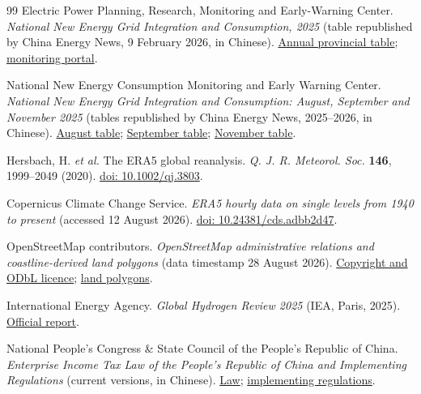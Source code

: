 \documentclass[lineno,pdflatex,sn-nature]{sn-jnl}
\begin{document}
\begin{thebibliography}{99}
Electric Power Planning, Research, Monitoring and Early-Warning Center. \emph{National New Energy Grid Integration and Consumption, 2025} (table republished by China Energy News, 9 February 2026, in Chinese). \href{https://epaper.ceic.com/pad/content/202602/09/content_20205.html}{Annual provincial table}; \href{https://www.xnyxnyj.cn/}{monitoring portal}.

National New Energy Consumption Monitoring and Early Warning Center. \emph{National New Energy Grid Integration and Consumption: August, September and November 2025} (tables republished by China Energy News, 2025--2026, in Chinese). \href{https://epaper.ceic.com/pc/attachment/202510/13/26e6af76-e1b7-40fb-b126-bc59f391e51c.pdf}{August table}; \href{https://epaper.ceic.com/pc/attachment/202511/07/6063762d-43ea-41fc-a37d-5f5549f62a5d.pdf}{September table}; \href{https://epaper.ceic.com/pc/attachment/202601/12/bf2a9f58-b724-435d-8c46-447e3ebbdc3d.pdf}{November table}.

Hersbach, H. \emph{et al.} The ERA5 global reanalysis. \emph{Q. J. R. Meteorol. Soc.} \textbf{146}, 1999--2049 (2020). \href{https://doi.org/10.1002/qj.3803}{doi: 10.1002/qj.3803}.

Copernicus Climate Change Service. \emph{ERA5 hourly data on single levels from 1940 to present} (accessed 12 August 2026). \href{https://doi.org/10.24381/cds.adbb2d47}{doi: 10.24381/cds.adbb2d47}.

OpenStreetMap contributors. \emph{OpenStreetMap administrative relations and coastline-derived land polygons} (data timestamp 28 August 2026). \href{https://www.openstreetmap.org/copyright}{Copyright and ODbL licence}; \href{https://osmdata.openstreetmap.de/data/land-polygons.html}{land polygons}.

International Energy Agency. \emph{Global Hydrogen Review 2025} (IEA, Paris, 2025). \href{https://www.iea.org/reports/global-hydrogen-review-2025}{Official report}.

National People's Congress \& State Council of the People's Republic of China. \emph{Enterprise Income Tax Law of the People's Republic of China and Implementing Regulations} (current versions, in Chinese). \href{https://flk.npc.gov.cn/detail?id=ff8080816f135f46016f2106acd11784}{Law}; \href{https://policy.mofcom.gov.cn/claw/clawContent.shtml?id=102338}{implementing regulations}.

\end{thebibliography}
\end{document}
